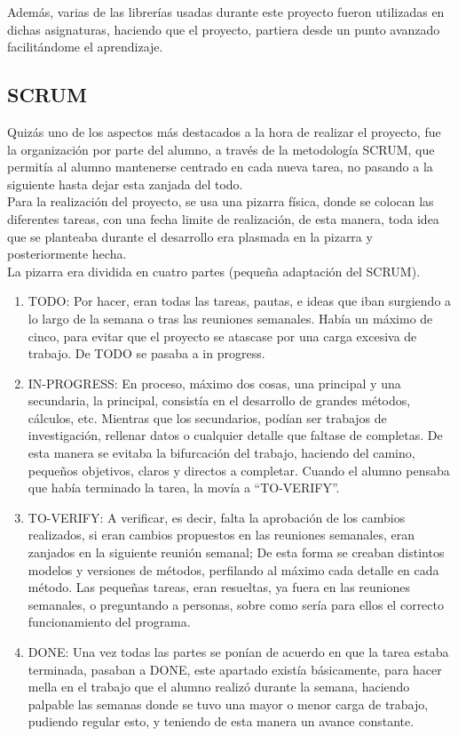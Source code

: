 Además, varias de las librerías usadas durante este proyecto fueron utilizadas en dichas asignaturas, haciendo que el proyecto, partiera desde un punto avanzado facilitándome el aprendizaje.
\subsection{SCRUM}
Quizás uno de los aspectos más destacados a la hora de realizar el proyecto, fue la organización por parte del alumno, a través de la metodología SCRUM, que permitía al alumno mantenerse centrado en cada nueva tarea, no pasando a la siguiente hasta dejar esta zanjada del todo. \\

Para la realización del proyecto, se usa una pizarra física, donde se colocan las diferentes tareas, con una fecha limite de realización, de esta manera, toda idea que se planteaba durante el desarrollo era plasmada en la pizarra y posteriormente hecha. \\
La pizarra era dividida en cuatro partes (pequeña adaptación del SCRUM).\\
\begin{enumerate}
\item	TODO: Por hacer, eran todas las tareas, pautas, e ideas que iban surgiendo a lo largo de la semana o tras las reuniones semanales. Había un máximo de cinco, para evitar que el proyecto se atascase por una carga excesiva de trabajo. De TODO se pasaba a in progress. 
\item	IN-PROGRESS: En proceso, máximo dos cosas, una principal y una secundaria, la principal, consistía en el desarrollo de grandes métodos, cálculos, etc. Mientras que los secundarios, podían ser trabajos de investigación, rellenar datos o cualquier detalle que faltase de completas. De esta manera se evitaba la bifurcación del trabajo, haciendo del camino, pequeños objetivos, claros y directos a completar. Cuando el alumno pensaba que había terminado la tarea, la movía a “TO-VERIFY”.
\item	TO-VERIFY: A verificar, es decir, falta la aprobación de los cambios realizados, si eran cambios propuestos en las reuniones semanales, eran zanjados en la siguiente reunión semanal; De esta forma se creaban distintos modelos y versiones de métodos, perfilando al máximo cada detalle en cada método. Las pequeñas tareas, eran resueltas, ya fuera en las reuniones semanales, o preguntando a personas, sobre como sería para ellos el correcto funcionamiento del programa.
\item	DONE: Una vez todas las partes se ponían de acuerdo en que la tarea estaba terminada, pasaban a DONE, este apartado existía básicamente, para hacer mella en el trabajo que el alumno realizó durante la semana, haciendo palpable las semanas donde se tuvo una mayor o menor carga de trabajo, pudiendo regular esto, y teniendo de esta manera un avance constante.
\end{enumerate}
